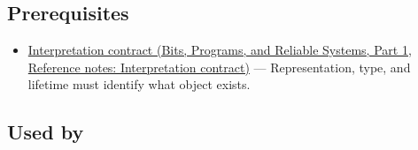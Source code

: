 \subsection{Prerequisites}\label{appendix-0b104bcba06b-prerequisites}

\hypertarget{appendix-0b104bcba06b-prerequisites}{}

\begin{itemize}
\tightlist
\item
  \href{../01-Bits-Programs-and-Reliable-Systems-P01/main.pdf\#appendix-f414bd4ed05c}{Interpretation contract (Bits, Programs, and Reliable Systems, Part 1, Reference notes: Interpretation contract)} --- Representation, type, and lifetime must identify what object exists.
\end{itemize}

\subsection{Used by}\label{appendix-0b104bcba06b-used-by}

\hypertarget{appendix-0b104bcba06b-used-by}{}

